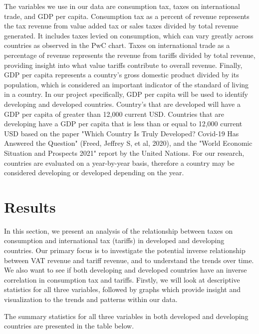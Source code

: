 \documentclass[12pt]{article}
\begin{document}
The variables we use in our data are consumption tax, taxes on international trade, and GDP per capita. Consumption tax as a percent of revenue represents the tax revenue from value added tax or sales taxes divided by total revenue generated. It includes taxes levied on consumption, which can vary greatly across countries as observed in the PwC chart. Taxes on international trade as a percentage of revenue represents the revenue from tariffs divided by total revenue, providing insight into what value tariffs contribute to overall revenue. Finally, GDP per capita represents a country's gross domestic product divided by its population, which is considered an important indicator of the standard of living in a country. In our project specifically, GDP per capita will be used to identify developing and developed countries. Country's that are developed will have a GDP per capita of greater than 12,000 current USD. Countries that are developing have a GDP per capita that is less than or equal to 12,000 current USD based on the paper "Which Country Is Truly Developed? Covid-19 Has Answered the Question" (Freed, Jeffrey S, et al, 2020), and the "World Economic Situation and Prospects 2021" report by the United Nations. For our research, countries are evaluated on a year-by-year basis, therefore a country may be considered developing or developed depending on the year. 


\section{Results}
\label{sec:result}

In this section, we present an analysis of the relationship between taxes on consumption and international tax (tariffs) in developed and developing countries. Our primary focus is to investigate the potential inverse relationship between VAT revenue and tariff revenue, and to understand the trends over time. We also want to see if both developing and developed countries have an inverse correlation in consumption tax and tariffs. Firstly, we will look at descriptive statistics for all three variables, followed by graphs which provide insight and visualization to the trends and patterns within our data.

The summary statistics for all three variables in both developed and developing countries are presented in the table below.  
\end{document}

